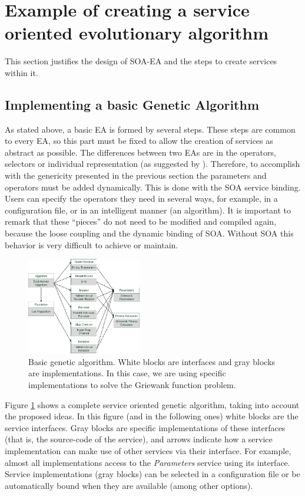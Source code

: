 \section{Example of creating a service oriented evolutionary algorithm}
This section justifies the design of SOA-EA and the steps to create services within it. 
\subsection{Implementing a basic Genetic Algorithm}

As  stated above, a basic EA is formed by several steps. These steps are common to every EA, so this part must be fixed  to allow the creation of services as abstract as possible. The differences between two EAs are in the operators, selectors or individual representation (as suggested by \cite{PARAMETERTUNING11}). Therefore, to accomplish with the genericity presented in the previous section the parameters and operators must be added dynamically. This is done with the SOA service binding. Users can specify the operators they need in several ways, for example, in a configuration file, or in an intelligent manner (an algorithm). It is important to remark that these ``pieces'' do not need to be modified and compiled again, because the loose coupling and the dynamic binding of SOA. Without SOA this behavior is very difficult to achieve or maintain.


\begin{figure}
\centering
\includegraphics[width=5cm]{gfx/soaea/basicga.jpg}
\caption{Basic genetic algorithm. White blocks are interfaces and gray blocks are implementations. In this case, we are using specific implementations to solve the Griewank function problem.}
\label{BASICGAEXAMPLE}
\end{figure}





Figure \ref{BASICGAEXAMPLE} shows a complete service oriented genetic algorithm, taking into account the proposed ideas. In this figure (and in the following ones) white blocks are the service interfaces. Gray blocks are specific implementations of these interfaces (that is, the source-code of the service), and  arrows indicate how a service implementation can make use of other services via their interface. For example, almost all implementations access to the {\em Parameters} service using its interface. Service implementations (gray blocks) can be selected in a configuration file or be automatically bound when they are available (among other options).

